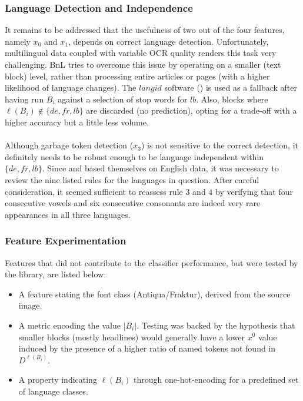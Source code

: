 \documentclass{jdmdh}
\begin{document}
\subsubsection{Language Detection and Independence}
It remains to be addressed that the usefulness of two out of the four features, namely $x_0$ and $x_1$, depends on correct language detection. Unfortunately, multilingual data coupled with variable OCR quality renders this task very challenging. BnL tries to overcome this issue by operating on a smaller (text block) level, rather than processing entire articles or pages (with a higher likelihood of language changes). The $langid$ software (\citet{lui}) is used as a fallback after having run $B_i$ against a selection of stop words for $lb$. Also, blocks  where $\ell(B_i)\notin\{de, fr, lb\}$ are discarded (no prediction), opting for a trade-off with a higher accuracy but a little less volume. \\ \\
Although garbage token detection ($x_3$) is not sensitive to the correct detection, it definitely needs to be robust enough to be language independent within $\{de, fr, lb\}$. Since \citet{kulp} and \citet{taghva} based themselves on English data, it was necessary to review the nine listed rules for the languages in question. After careful consideration, it seemed sufficient to reassess rule $3$ and $4$ by verifying that four consecutive vowels and six consecutive consonants are indeed very rare appearances in all three languages.
\subsubsection{Feature Experimentation}
Features that did not contribute to the classifier performance, but were tested by the library, are listed below: \\
\begin{itemize}
    \item A feature stating the font class (Antiqua/Fraktur), derived from the source image.
    \item A metric encoding the value $|B_i|$. Testing was backed by the hypothesis that smaller blocks (mostly headlines) would generally have a lower $x^0$ value induced by the presence of a higher ratio of named tokens not found in $D^{\ell(B_i)}$.
    \item A property indicating $\ell(B_i)$ through one-hot-encoding for a predefined set of language classes.
\end{itemize}
\end{document}
